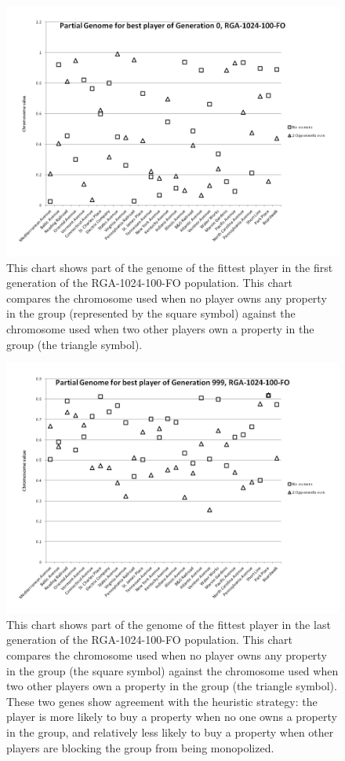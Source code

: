 \begin{figure}[htp]
\centerline{\includegraphics[width=0.75\columnwidth]{Figures/genome000.png}}
\caption[Illustration of Genome, Generation 0]{This chart shows part of the
genome of the fittest player in the first generation of the RGA-1024-100-FO
population. This chart compares the chromosome used when no player owns
any property in the group (represented by the square symbol) against the
chromosome used when two other players own a property in the group (the triangle
symbol).}
\label{figure-genome0}
\end{figure}

\begin{figure}[htp]
\centerline{\includegraphics[width=0.75\columnwidth]{Figures/genome999.png}}
\caption[Illustration of Genome, Generation 999]{This chart shows part of the
genome of the fittest player in the last generation of the RGA-1024-100-FO
population. This chart compares the chromosome used when no player owns any
property in the group (the square symbol) against the chromosome used when two
other players own a property in the group (the triangle symbol). These two genes
show agreement with the heuristic strategy: the player is more likely to buy a
property when no one owns a property in the group, and relatively less likely to
buy a property when other players are blocking the group from being
monopolized.}
\label{figure-genome999}
\end{figure}

